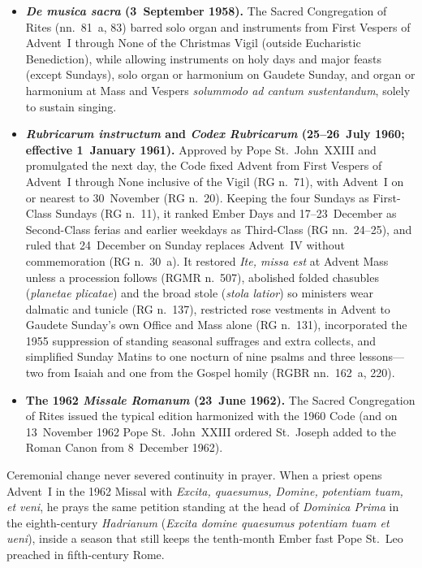\begin{itemize}
\item \textbf{\textit{De musica sacra} (3~September 1958).} The Sacred
Congregation of Rites (nn.\ 81~a, 83) barred solo organ and instruments
from First Vespers of Advent~I through None of the Christmas Vigil (outside
Eucharistic Benediction), while allowing instruments on holy days and major
feasts (except Sundays), solo organ or harmonium on Gaudete Sunday, and
organ or harmonium at Mass and Vespers \textit{solummodo ad cantum
sustentandum}, solely to sustain singing.

\item \textbf{\textit{Rubricarum instructum} and \textit{Codex Rubricarum}
(25--26~July 1960; effective 1~January 1961).} Approved by Pope St.~John~XXIII
and promulgated the next day, the Code fixed Advent from First Vespers of
Advent~I through None inclusive of the Vigil (RG n.\ 71), with Advent~I on
or nearest to 30~November (RG n.\ 20). Keeping the four Sundays as
First-Class Sundays (RG n.\ 11), it ranked Ember Days and 17--23~December
as Second-Class ferias and earlier weekdays as Third-Class (RG nn.\ 24--25),
and ruled that 24~December on Sunday replaces Advent~IV without
commemoration (RG n.\ 30~a). It restored \textit{Ite, missa est} at Advent
Mass unless a procession follows (RGMR n.\ 507), abolished folded chasubles
(\textit{planetae plicatae}) and the broad stole (\textit{stola latior}) so
ministers wear dalmatic and tunicle (RG n.\ 137), restricted rose vestments
in Advent to Gaudete Sunday's own Office and Mass alone (RG n.\ 131),
incorporated the 1955 suppression of standing seasonal suffrages and extra
collects, and simplified Sunday Matins to one nocturn of nine psalms and
three lessons---two from Isaiah and one from the Gospel homily (RGBR
nn.\ 162~a, 220).

\item \textbf{The 1962 \textit{Missale Romanum} (23~June 1962).} The Sacred
Congregation of Rites issued the typical edition harmonized with the 1960
Code (and on 13~November 1962 Pope St.~John~XXIII ordered St.~Joseph added
to the Roman Canon from 8~December 1962).
\end{itemize}

Ceremonial change never severed continuity in prayer. When a priest opens
Advent~I in the 1962 Missal with \textit{Excita, quaesumus, Domine,
potentiam tuam, et veni}, he prays the same petition standing at the head
of \textit{Dominica Prima} in the eighth-century \textit{Hadrianum}
(\textit{Excita domine quaesumus potentiam tuam et ueni}), inside a season
that still keeps the tenth-month Ember fast Pope St.~Leo preached in
fifth-century Rome.


